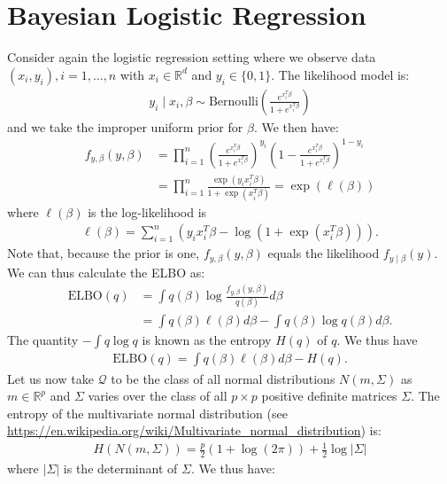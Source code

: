 \documentclass{scrartcl}
\newcommand{\R}{{\mathbb R}}
\newcommand{\Qcal}{{\mathcal{Q}}}
\begin{document}
\section{Bayesian Logistic Regression}
Consider again the logistic regression setting where we observe data
$(x_i, y_i), i = 1, \dots, n$ with $x_i \in \R^d$ and $y_i \in \{0,
1\}$. The likelihood model is:
\begin{align*}
  y_i \mid x_i, \beta \sim \text{Bernoulli}\left(\frac{e^{x_i^T
  \beta}}{1 + e^{x_i^T \beta}} \right)
\end{align*}
and we take the improper uniform prior for $\beta$. We then have:
\begin{align*}
  f_{y, \beta}(y, \beta) &= \prod_{i=1}^n \left(\frac{e^{x_i^T
  \beta}}{1 + e^{x_i^T \beta}} \right)^{y_i} \left(1 - \frac{e^{x_i^T
                           \beta}}{1 + e^{x_i^T \beta}} \right)^{1-y_i} \\
  &= \prod_{i=1}^n \frac{\exp(y_i x_i^T \beta)}{1 + \exp(x_i^T
    \beta)} = \exp(\ell(\beta))
\end{align*}
where $\ell(\beta)$ is the log-likelihood is
\begin{align}\label{loglik}
  \ell(\beta) = \sum_{i=1}^n \left(y_i x_i^T \beta - \log \left(1 +
  \exp(x_i^T \beta) \right) \right).
\end{align}
Note that, because the prior is one, $f_{y, \beta}(y, \beta)$ equals
the likelihood $f_{y \mid \beta}(y)$. We can thus calculate the ELBO as:
\begin{align*}
  \text{ELBO}(q) &= \int q(\beta) \log \frac{f_{y, \beta}(y, \beta)}{q(\beta)} d\beta \\
  &= \int q(\beta) \ell(\beta) d\beta - \int q(\beta) \log q(\beta) d\beta.
\end{align*}
The quantity $-\int q \log q$ is known as the entropy $H(q)$ of
$q$. We thus have
\begin{align*}
  \text{ELBO}(q) = \int q(\beta) \ell(\beta) d\beta - H(q). 
\end{align*}
Let us now take $\Qcal$ to be the class of all normal distributions $N(m,
\Sigma)$ as $m \in \R^p$ and $\Sigma$ varies over the class of all $p
\times p$ positive definite matrices $\Sigma$. The entropy of the
multivariate normal distribution (see
\url{https://en.wikipedia.org/wiki/Multivariate_normal_distribution})
is:
\begin{align*}
  H(N(m, \Sigma)) = \frac{p}{2} \left(1 + \log (2 \pi) \right) +
  \frac{1}{2} \log |\Sigma|
\end{align*}
where $|\Sigma|$ is the determinant of $\Sigma$. We thus have:
\end{document}
